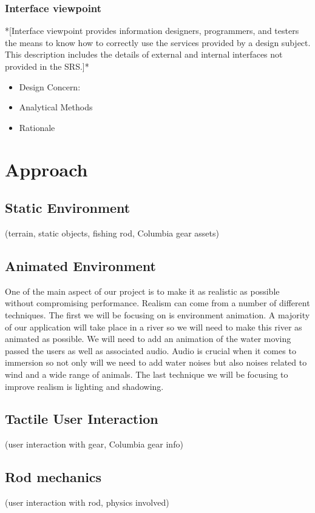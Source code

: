 \documentclass[10pt,journal,compsoc,onecolumn, draftclsnofoot]{IEEEtran}
\begin{document}
\subsubsection{Interface viewpoint}
*[Interface viewpoint provides information designers, programmers, and testers the means to know how to correctly use the services provided by a design subject. This description includes the details of external and internal interfaces not provided in the SRS.]*
\begin{itemize}
  \item Design Concern:
  \item Analytical Methods
  \item Rationale
\end{itemize}


\section{Approach}
\subsection{Static Environment}
(terrain, static objects, fishing rod, Columbia gear assets)

\subsection{Animated Environment}
One of the main aspect of our project is to make it as realistic as possible without compromising performance. Realism can come from a number of different techniques. The first we will be focusing on is environment animation. A majority of our application will take place in a river so we will need to make this river as animated as possible. We will need to add an animation of the water moving passed the users as well as associated audio. Audio is crucial when it comes to immersion so not only will we need to add water noises but also noises related to wind and a wide range of animals. The last technique we will be focusing to improve realism is lighting and shadowing.

\subsection{Tactile User Interaction}
(user interaction with gear, Columbia gear info)

\subsection{Rod mechanics}
(user interaction with rod, physics involved)





% 
% 
\end{document}
